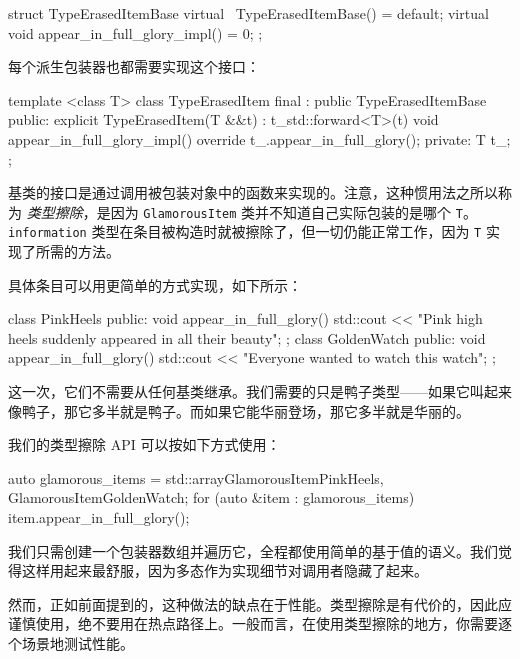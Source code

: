 \begin{codebox}[cpp]
struct TypeErasedItemBase {
    virtual ~TypeErasedItemBase() = default;
    virtual void appear_in_full_glory_impl() = 0;
};
\end{codebox}

每个派生包装器也都需要实现这个接口：

\begin{codebox}[cpp]
template <class T> class TypeErasedItem final : public TypeErasedItemBase {
    public:
        explicit TypeErasedItem(T &&t) : t_{std::forward<T>(t)} {}
        void appear_in_full_glory_impl() override { t_.appear_in_full_glory(); }
    private:
        T t_;
    };
\end{codebox}

\label{idx:558}
基类的接口是通过调用被包装对象中的函数来实现的。注意，这种惯用法之所以称为 \emph{类型擦除}，是因为 \texttt{Glamorous\allowbreak{}Item} 类并不知道自己实际包装的是哪个 \texttt{T}。\texttt{information} 类型在条目被构造时就被擦除了，但一切仍能正常工作，因为 \texttt{T} 实现了所需的方法。

具体条目可以用更简单的方式实现，如下所示：

\begin{codebox}[cpp]
class PinkHeels {
public:
    void appear_in_full_glory() {
        std::cout << "Pink high heels suddenly appeared in all their beauty\n";
    }
};
class GoldenWatch {
public:
    void appear_in_full_glory() {
        std::cout << "Everyone wanted to watch this watch\n";
    }
};
\end{codebox}

这一次，它们不需要从任何基类继承。我们需要的只是鸭子类型——如果它叫起来像鸭子，那它多半就是鸭子。而如果它能华丽登场，那它多半就是华丽的。

我们的类型擦除 API 可以按如下方式使用：

\begin{codebox}[cpp]
auto glamorous_items = std::array{GlamorousItem{PinkHeels{}}, GlamorousItem{GoldenWatch{}}};
    for (auto &item : glamorous_items) {
        item.appear_in_full_glory();
    }
\end{codebox}

\label{idx:559}
我们只需创建一个包装器数组并遍历它，全程都使用简单的基于值的语义。我们觉得这样用起来最舒服，因为多态作为实现细节对调用者隐藏了起来。

然而，正如前面提到的，这种做法的缺点在于性能。类型擦除是有代价的，因此应谨慎使用，绝不要用在热点路径上。一般而言，在使用类型擦除的地方，你需要逐个场景地测试性能。

